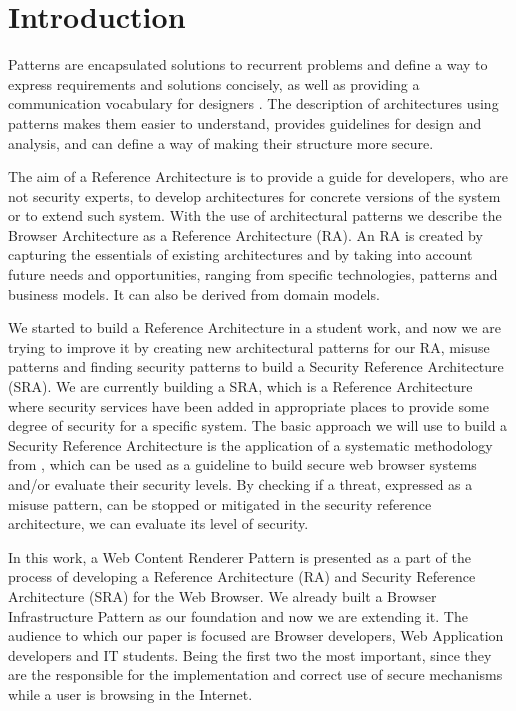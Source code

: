 \documentclass{sig-alternate-05-2015}
\begin{document}





\section{Introduction}
Patterns are encapsulated solutions to recurrent problems and define a way to express requirements and solutions concisely, as well as providing a communication vocabulary for designers \cite{gamma1994design}. The description of architectures using patterns makes them easier to understand, provides guidelines for design and analysis, and can define a way of making their structure more secure.

The aim of a Reference Architecture is to provide a guide for developers, who are not security experts, to develop architectures for concrete versions of the system or to extend such system. With the use of architectural patterns we describe the Browser Architecture as a Reference Architecture (RA). An RA is created by capturing the essentials of existing architectures and by taking into account future needs and opportunities, ranging from specific technologies, patterns and business models. It can also be derived from domain models.

We started to build a Reference Architecture in a student work, and now we are trying to improve it by creating new architectural patterns for our RA, misuse patterns and finding security patterns to build a Security Reference Architecture (SRA). We are currently building a SRA, which is a Reference Architecture where security services have been added in appropriate places to provide some degree of security for a specific system. The basic approach we will use to build a Security Reference Architecture is the application of a systematic methodology from \cite{fernandez2006methodology,Fernandez2011,Fernandez2015}, which can be used as a guideline to build secure web browser systems and/or evaluate their security levels. By checking if a threat, expressed as a misuse pattern, can be stopped or mitigated in the security reference architecture, we can evaluate its level of security.

In this work, a Web Content Renderer Pattern is presented as a part of the process of developing a Reference Architecture (RA) and Security Reference Architecture (SRA) for the Web Browser. We already built a Browser Infrastructure Pattern as our foundation and now we are extending it. The audience to which our paper is focused are Browser developers, Web Application developers and IT students. Being the first two the most important, since they are the responsible for the implementation and correct use of secure mechanisms while a user is browsing in the Internet. 
\end{document}
